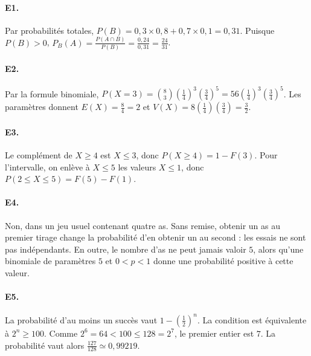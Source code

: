 \paragraph{E1.}Par probabilités totales, $P(B)=0{,}3\times0{,}8+0{,}7\times0{,}1=0{,}31$. Puisque $P(B)>0$, $P_B(A)=\frac{P(A\cap B)}{P(B)}=\frac{0{,}24}{0{,}31}=\frac{24}{31}$.

\paragraph{E2.}Par la formule binomiale, $P(X=3)=\binom{8}{3}(\frac{1}{4})^3(\frac{3}{4})^5=56(\frac{1}{4})^3(\frac{3}{4})^5$. Les paramètres donnent $E(X)=\frac{8}{4}=2$ et $V(X)=8(\frac{1}{4})(\frac{3}{4})=\frac{3}{2}$.

\paragraph{E3.}Le complément de $X\ge4$ est $X\le3$, donc $P(X\ge4)=1-F(3)$. Pour l'intervalle, on enlève à $X\le5$ les valeurs $X\le1$, donc $P(2\le X\le5)=F(5)-F(1)$.

\paragraph{E4.}Non, dans un jeu usuel contenant quatre as. Sans remise, obtenir un as au premier tirage change la probabilité d'en obtenir un au second : les essais ne sont pas indépendants. En outre, le nombre d'as ne peut jamais valoir $5$, alors qu'une binomiale de paramètres $5$ et $0<p<1$ donne une probabilité positive à cette valeur.

\paragraph{E5.}La probabilité d'au moins un succès vaut $1-(\frac{1}{2})^n$. La condition est équivalente à $2^n\ge100$. Comme $2^6=64<100\le128=2^7$, le premier entier est $7$. La probabilité vaut alors $\frac{127}{128}\simeq0{,}99219$.


